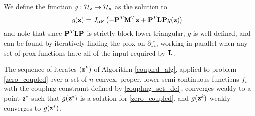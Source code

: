 We define the function $g : \mathcal{H}_\text{z} \to \mathcal{H}_\text{x}$ as the solution to 
\begin{equation}\label{g_def}
    g(\mathbf{z}) = J_{\alpha \mathbf{F}}\left(-\mathbf{P}^T\mathbf{M}^T\mathbf{z} + \mathbf{P}^T\mathbf{L} \mathbf{P}g(\mathbf{z})\right)
\end{equation}
and note that since $\mathbf{P}^T\mathbf{L}\mathbf{P}$ is strictly block lower triangular, $g$ is well-defined, and can be found by iteratively finding the prox on $\partial f_i$, working in parallel when any set of prox functions have all of the input required by $\mathbf{L}$.
\begin{theorem}
The sequence of iterates $(\mathbf{z}^k)$ of Algorithm \ref{coupled_alg}, applied to problem \eqref{zero_coupled} over a set of $n$ convex, proper, lower semi-continuous functions $f_i$ with the coupling constraint defined by \eqref{coupling_set_def}, converges weakly to a point $\mathbf{z}^*$ such that $g(\mathbf{z}^*)$ is a solution for \eqref{zero_coupled}, and $g(\mathbf{z}^k)$ weakly converges to $g(\mathbf{z}^*)$.
\end{theorem}

